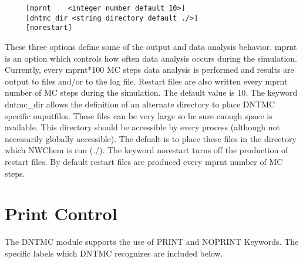 \begin{verbatim}
     [mprnt    <integer number default 10>]
     [dntmc_dir <string directory default ./>]
     [norestart]
\end{verbatim}
These three options define some of the output and data analysis
behavior. mprnt is an option which controls how often data analysis
occurs during the simulation.  Currently, every mprnt*100 MC steps
data analysis is performed and results are output to files and/or to
the log file.  Restart files are also written every mprnt number of
MC steps during the simulation.  The default value is 10. The
keyword dntmc\_dir allows the definition of an alternate directory
to place DNTMC specific ouputfiles.  These files can be very large
so be sure enough space is available.  This directory should be
accessible by every process (although not necessarily globally
accessible).  The defualt is to place these files in the directory
which NWChem is run (./).  The keyword norestart turns off the
production of restart files. By default restart files are produced
every mprnt number of MC steps.

\section{Print Control}
The DNTMC module supports the use of PRINT and NOPRINT Keywords. The
specific labels which DNTMC recognizes are included below.

